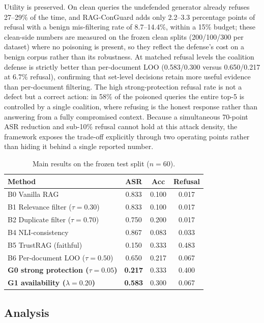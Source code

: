 \documentclass[sigconf]{acmart}
\begin{document}
Utility is preserved. On clean queries the undefended generator already refuses 27--29\% of the time, and RAG-ConGuard adds only 2.2--3.3 percentage points of refusal with a benign mis-filtering rate of 8.7--14.4\%, within a 15\% budget; these clean-side numbers are measured on the frozen clean splits (200/100/300 per dataset) where no poisoning is present, so they reflect the defense's cost on a benign corpus rather than its robustness. At matched refusal levels the coalition defense is strictly better than per-document LOO (0.583/0.300 versus 0.650/0.217 at 6.7\% refusal), confirming that set-level decisions retain more useful evidence than per-document filtering. The high strong-protection refusal rate is not a defect but a correct action: in 58\% of the poisoned queries the entire top-5 is controlled by a single coalition, where refusing is the honest response rather than answering from a fully compromised context. Because a simultaneous 70-point ASR reduction and sub-10\% refusal cannot hold at this attack density, the framework exposes the trade-off explicitly through two operating points rather than hiding it behind a single reported number.

\begin{table}[t]
  \caption{Main results on the frozen test split ($n=60$).}
  \label{tab:main}
  \begin{tabular}{lccc}
    \toprule
    Method & ASR & Acc & Refusal \\
    \midrule
    B0 Vanilla RAG & 0.833 & 0.100 & 0.017 \\
    B1 Relevance filter ($\tau=0.30$) & 0.833 & 0.100 & 0.017 \\
    B2 Duplicate filter ($\tau=0.70$) & 0.750 & 0.200 & 0.017 \\
    B4 NLI-consistency & 0.867 & 0.083 & 0.033 \\
    B5 TrustRAG (faithful) & 0.150 & 0.333 & 0.483 \\
    B6 Per-document LOO ($\tau=0.50$) & 0.650 & 0.217 & 0.067 \\
    \textbf{G0 strong protection ($\tau=0.05$)} & \textbf{0.217} & 0.333 & 0.400 \\
    \textbf{G1 availability ($\lambda=0.20$)} & \textbf{0.583} & 0.300 & 0.067 \\
    \bottomrule
  \end{tabular}
\end{table}

\subsection{Analysis}
\label{sec:analysis}
\end{document}
